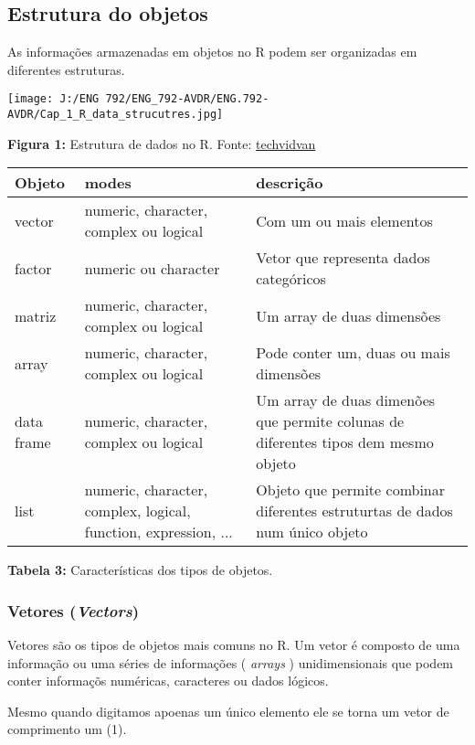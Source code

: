 \documentclass[
]{book}
\begin{document}
\hypertarget{estrutura-do-objetos}{%
\subsection{Estrutura do objetos}\label{estrutura-do-objetos}}

As informações armazenadas em objetos no R podem ser organizadas em diferentes estruturas.

\texttt{[image: J:/ENG 792/ENG\_792-AVDR/ENG.792-AVDR/Cap\_1\_R\_data\_strucutres.jpg]}

\textbf{Figura 1:} Estrutura de dados no R. Fonte: \href{https://techvidvan.com/tutorials/r-data-structures/}{techvidvan}

\begin{tabular}{l|l|l}
\hline
Objeto & modes & descrição\\
\hline
vector & numeric, character, complex ou logical & Com um ou  mais elementos\\
\hline
factor & numeric ou character & Vetor que representa dados categóricos\\
\hline
matriz & numeric, character, complex ou logical & Um array de duas dimensões\\
\hline
array & numeric, character, complex ou logical & Pode conter um, duas ou mais dimensões\\
\hline
data frame & numeric, character, complex ou logical & Um array de duas dimenões que permite colunas de diferentes tipos dem mesmo objeto\\
\hline
list & numeric, character, complex, logical, function, expression, ... & Objeto que permite combinar diferentes estruturtas de dados num único objeto\\
\hline
\end{tabular}

\textbf{Tabela 3:} Características dos tipos de objetos.

\hypertarget{vetores-vectors}{%
\subsubsection{\texorpdfstring{Vetores (\emph{Vectors})}{Vetores (Vectors)}}\label{vetores-vectors}}

Vetores são os tipos de objetos mais comuns no R. Um vetor é composto de uma informação ou uma séries de informações ( \emph{arrays} ) unidimensionais que podem conter informaçõs numéricas, caracteres ou dados lógicos.

Mesmo quando digitamos apoenas um único elemento ele se torna um vetor de comprimento um (1).
\end{document}
